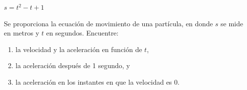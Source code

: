 \item $s = t^2 - t + 1$
\par
Se proporciona la ecuación de movimiento de una partícula, en donde $s$ se mide en metros y $t$ en segundos. Encuentre:
\begin{enumerate}
    \item[(a)] la velocidad y la aceleración en función de $t$,
    \item[(b)] la aceleración después de 1 segundo, y
    \item[(c)] la aceleración en los instantes en que la velocidad es 0.
\end{enumerate}
